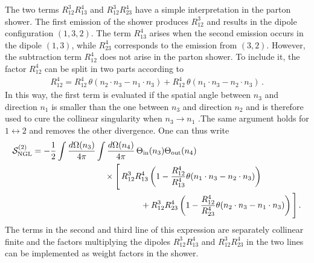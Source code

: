 \documentclass[11pt,a4paper]{article}
\begin{document}
The two terms $R_{12}^{3} R_{13}^{4} $ and $R_{12}^{3} R_{23}^{4}$ have a simple interpretation in the parton shower. The first emission of the shower produces $R_{12}^{3}$ and results in the dipole configuration $(1,3,2)$. The term $R_{13}^{4} $ arises when the second emission occurs in the dipole $(1,3)$, while $R_{23}^{4}$ corresponds to the emission from $(3,2)$. However, the subtraction term $R_{12}^4$ does not arise in the parton shower. To include it, the factor $R_{12}^4$  can be split in two parts according to
\begin{align}
R_{12}^{4}=R_{12}^{4}\,\theta(n_2\cdot n_3-n_1\cdot n_3)+R_{12}^{4}\,\theta(n_1\cdot n_3-n_2\cdot n_3) \, .
\end{align}
In this way, the first term is evaluated if the spatial angle between $n_3$ and direction $n_1$ is smaller than the one between $n_3$ and direction $n_2$ and is therefore used to cure the collinear singularity when $n_3\rightarrow n_1$ .The same argument holds for $1\leftrightarrow 2$ and removes the other divergence. One can thus write 
\begin{align}\label{eq:S2split}
\mathcal{S}_{\rm NGL} ^{(2)}&=-\frac{1}{2}  \int \frac{d\Omega (n_3)}{4\pi}\int \frac{d\Omega (n_4)}{4\pi}\, \Theta_{\rm in}(n_3)\Theta_{\rm out}(n_4)\nonumber\\
&\hspace{3cm} \times \Bigg[\, R_{12}^{3}R_{13}^{4}\left(1-\frac{R_{12}^4}{R_{13}^4}\theta(n_1\cdot n_3-n_2\cdot n_3)\right)\nonumber\\
&\hspace{4.5cm}+ R_{12}^{3}R_{23}^4\left(1-\frac{R_{12}^4}{R_{23}^4}\theta(n_2\cdot n_3-n_1\cdot n_3)\right)\Bigg]\, .
\end{align} 
The terms in the second and third line of this expression are separately collinear finite and the factors multiplying the dipoles $R_{12}^{3}R_{13}^{4}$ and $R_{12}^{3}R_{23}^4$ in the two lines can be implemented as weight factors in the shower.
\end{document}
